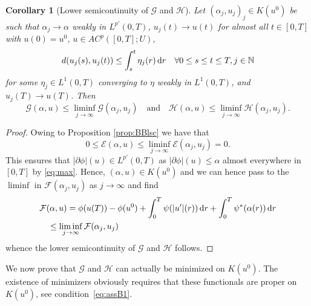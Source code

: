 \documentclass[reqno]{amsart}
\newcommand{\Nz}{\mathbb{N}}
\newcommand{\dr}{{\rm d} r}
\renewcommand{\sl}{|\partial \phi|}
\newcommand{\GG}{{\mathcal G}}
\newcommand{\EE}{{\mathcal E}}
\newcommand{\FF}{{\mathcal F}}
\newcommand{\HH}{{\mathcal H}}
\newtheorem{corollary}[theorem]{Corollary}
\begin{document}
\begin{corollary}[Lower semicontinuity of $\GG$  and $\HH$]\label{prop:FFlsc}
  Let $(\alpha_j,u_j)_j \in K(u^0) $ be  such that
  $\alpha_j \to \alpha$ weakly in  $L^{p'}(0,T)$,   $u_j(t)
  \to u(t)$ for  almost  all $t\in[0,T]$  with $u(0)=u^0$, $u \in AC^p([0,T];U)$,
  \[
 d(u_j(s), u_j(t)) \le \int_s^t \eta_j(r) \,\dr \quad \forall 0 \le s \le t \le T, j \in \Nz
  \]
for some $\eta_j \in L^1(0,T)$ converging to $\eta$ weakly in $L^1(0,T)$, and $u_j(T) \to u(T)$. Then  
  \begin{equation*}
    \GG(\alpha,u)\leq \liminf_{j\to \infty}
    \GG(\alpha_j,u_j)\quad  \text{and} \quad \HH(\alpha,u)\leq \liminf_{j\to \infty}
    \HH(\alpha_j,u_j).
  \end{equation*} 
\end{corollary}
\begin{proof}
Owing to Proposition \ref{prop:BBlsc} we have
that
$$0\leq \EE (\alpha,u) \leq \liminf_{j \to \infty}\EE(\alpha_j ,
u_j) =0.$$
This ensures that $\sl(u) \in L^{p'}(0,T)$ as $ \sl(u)\leq \alpha$ almost
everywhere in $[0,T]$  by \eqref{eq:max}.
 Hence, $(\alpha,u)\in
K(u^0)$ and we can hence pass to the $\liminf$ in
$\FF(\alpha_j,u_j)$ as $j
\to \infty$ and find
\begin{align}
  &\FF(\alpha,u)  =  \phi(u(T))-\phi(u^0) +   \int_0^T \psi(|u'|(r))\,
    \dr +  \int_0^T \psi^*(\alpha(r))\, \dr \nonumber\\
  &\quad \leq \liminf_{j\to \infty}\FF(\alpha_j,u_j)\label{eq:lscdopo}
\end{align}
whence the  lower semicontinuity of $\GG$  and $\HH$  follows.
\end{proof}


We now   prove that  $
\GG$ and $\HH$ can actually be minimized on  $K(u^0)$.  The existence
of minimizers  obviously requires that  these functionals are  proper on $K(u^0)$, see condition~\eqref{eq:assB1}.  
\end{document}
